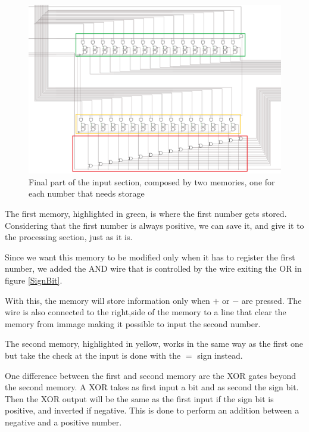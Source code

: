 \documentclass{article}
\begin{document}
\begin{figure}[h]
    \centering  
    \includegraphics[scale=.4]{IM_Memories.PNG}
    \caption{Final part of the input section, composed by two memories, one for each number that needs storage}
    \label{Memories}
\end{figure}

\vspace{3mm}

The first memory, highlighted in green, is where the first number gets stored. Considering that the first number is always positive, we can save it, and give it to the processing section, just as it is. 

\vspace{1mm}

Since we want this memory to be modified only when it has to register the first number, we added the AND wire that is controlled by the wire exiting the OR in figure \ref{SignBit}. 

\vspace{1mm}

With this, the memory will store information only when $+$ or $-$ are pressed. The wire is also connected to the right,side of the memory to a line that clear the memory from immage%
making it possible to input the second number.

\vspace{3mm}

The second memory, highlighted in yellow, works in the same way as the first one but take the check at the input is done with the $=$ sign instead. %

One difference between the first and second memory are the XOR gates beyond the second memory. A XOR takes as first input a bit and as second the sign bit. Then the XOR output will be the same as the first input if the sign bit is positive, and inverted if negative. This is done to perform an addition between a negative and a positive number. 
\end{document}
